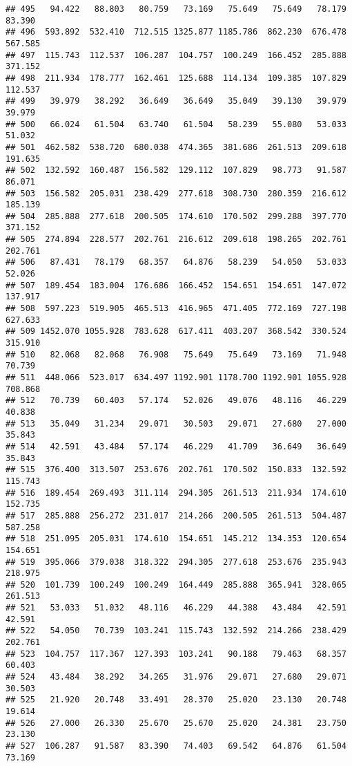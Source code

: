 \documentclass[
]{article}
\begin{document}
\begin{verbatim}
## 495   94.422   88.803   80.759   73.169   75.649   75.649   78.179   83.390
## 496  593.892  532.410  712.515 1325.877 1185.786  862.230  676.478  567.585
## 497  115.743  112.537  106.287  104.757  100.249  166.452  285.888  371.152
## 498  211.934  178.777  162.461  125.688  114.134  109.385  107.829  112.537
## 499   39.979   38.292   36.649   36.649   35.049   39.130   39.979   39.979
## 500   66.024   61.504   63.740   61.504   58.239   55.080   53.033   51.032
## 501  462.582  538.720  680.038  474.365  381.686  261.513  209.618  191.635
## 502  132.592  160.487  156.582  129.112  107.829   98.773   91.587   86.071
## 503  156.582  205.031  238.429  277.618  308.730  280.359  216.612  185.139
## 504  285.888  277.618  200.505  174.610  170.502  299.288  397.770  371.152
## 505  274.894  228.577  202.761  216.612  209.618  198.265  202.761  202.761
## 506   87.431   78.179   68.357   64.876   58.239   54.050   53.033   52.026
## 507  189.454  183.004  176.686  166.452  154.651  154.651  147.072  137.917
## 508  597.223  519.905  465.513  416.965  471.405  772.169  727.198  627.633
## 509 1452.070 1055.928  783.628  617.411  403.207  368.542  330.524  315.910
## 510   82.068   82.068   76.908   75.649   75.649   73.169   71.948   70.739
## 511  448.066  523.017  634.497 1192.901 1178.700 1192.901 1055.928  708.868
## 512   70.739   60.403   57.174   52.026   49.076   48.116   46.229   40.838
## 513   35.049   31.234   29.071   30.503   29.071   27.680   27.000   35.843
## 514   42.591   43.484   57.174   46.229   41.709   36.649   36.649   35.843
## 515  376.400  313.507  253.676  202.761  170.502  150.833  132.592  115.743
## 516  189.454  269.493  311.114  294.305  261.513  211.934  174.610  152.735
## 517  285.888  256.272  231.017  214.266  200.505  261.513  504.487  587.258
## 518  251.095  205.031  174.610  154.651  145.212  134.353  120.654  154.651
## 519  395.066  379.038  318.322  294.305  277.618  253.676  235.943  218.975
## 520  101.739  100.249  100.249  164.449  285.888  365.941  328.065  261.513
## 521   53.033   51.032   48.116   46.229   44.388   43.484   42.591   42.591
## 522   54.050   70.739  103.241  115.743  132.592  214.266  238.429  202.761
## 523  104.757  117.367  127.393  103.241   90.188   79.463   68.357   60.403
## 524   43.484   38.292   34.265   31.976   29.071   27.680   29.071   30.503
## 525   21.920   20.748   33.491   28.370   25.020   23.130   20.748   19.614
## 526   27.000   26.330   25.670   25.670   25.020   24.381   23.750   23.130
## 527  106.287   91.587   83.390   74.403   69.542   64.876   61.504   73.169

\end{verbatim}
\end{document}
